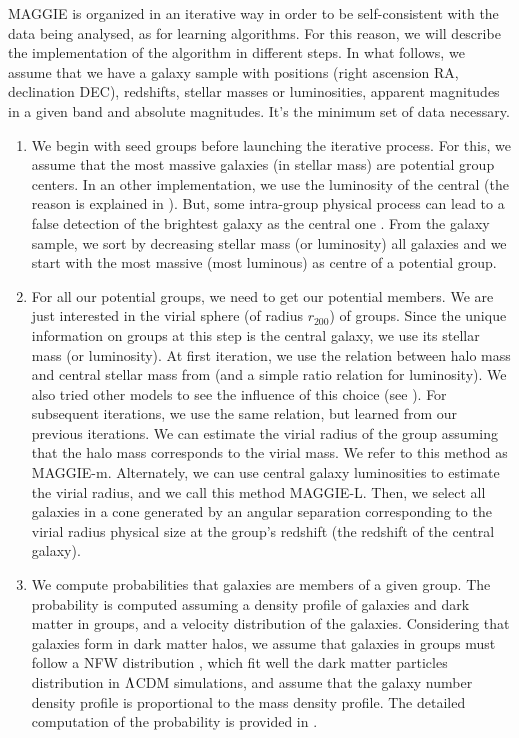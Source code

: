MAGGIE is organized in an iterative way in order to be self-consistent with the
data being analysed, as for learning algorithms. For this reason, we will
describe the implementation of the algorithm in different steps. In what
follows, we assume that we have a galaxy sample with positions (right ascension
RA, declination DEC), redshifts, stellar masses or luminosities, apparent
magnitudes in a given band and absolute magnitudes. It's the minimum set of
data necessary.
%
\begin{enumerate}
    \item We begin with seed groups before launching the iterative process. For
        this, we assume that the most massive galaxies (in stellar mass) are
        potential group centers. In an other implementation, we use the
        luminosity of the central (the reason is explained in
        ). But, some intra-group
        physical process can lead to a false detection of the brightest galaxy
        as the central one \citep{Ebeling+13}. From the galaxy sample, we sort
        by decreasing stellar mass (or luminosity) all galaxies and we start
        with the most massive (most luminous) as centre of a potential group.

    \item\label{step:2} For all our potential groups, we need to get our
        potential members. We are just interested in the virial sphere (of
        radius $r_{200}$) of groups. Since the unique information on groups at
        this step is the central galaxy, we use its stellar mass (or
        luminosity). At first iteration, we use the relation between halo mass
        and central stellar mass from \citet{BCW+10} (and a simple ratio
        relation for luminosity). We also tried other models to see the
        influence of this choice (see ). For
        subsequent iterations, we use the same relation, but learned from our
        previous iterations. We can estimate the virial radius of the group
        assuming that the halo mass corresponds to the virial mass. We refer to
        this method as MAGGIE-m. Alternately, we can use central galaxy
        luminosities to estimate the virial radius, and we call this method
        MAGGIE-L. Then, we select all galaxies in a cone generated by an
        angular separation corresponding to the virial radius physical size at
        the group's redshift (the redshift of the central galaxy).

    \item We compute probabilities that galaxies are members of a given group.
        The probability is computed assuming a density profile of galaxies and
        dark matter in groups, and a velocity distribution of the galaxies.
        Considering that galaxies form in dark matter halos, we assume that
        galaxies in groups must follow a NFW distribution \citep{NFW+97}, which
        fit well the dark matter particles distribution in $\rm \Lambda$CDM
        simulations, and assume that the galaxy number density profile is
        proportional to the mass density profile. The detailed computation of
        the probability is provided in .


\end{enumerate}
